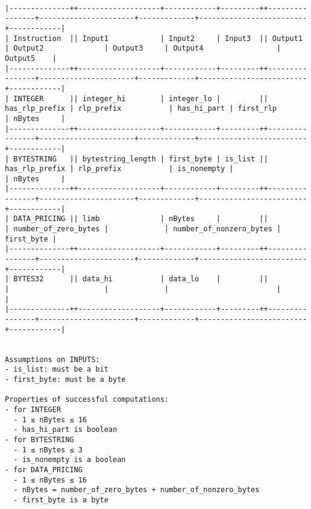 \documentclass[varwidth=\maxdimen,margin=0.5cm,multi={verbatim}]{standalone}
\begin{document}
\begin{verbatim}

|--------------++-------------------+------------+---------++----------------+----------------------+-------------+-------------------------+------------|
| Instruction  || Input1            | Input2     | Input3  || Output1        | Output2              | Output3     | Output4                 | Output5    |
|--------------++-------------------+------------+---------++----------------+----------------------+-------------+-------------------------+------------|
| INTEGER      || integer_hi        | integer_lo |         || has_rlp_prefix | rlp_prefix           | has_hi_part | first_rlp               | nBytes     |
|--------------++-------------------+------------+---------++----------------+----------------------+-------------+-------------------------+------------|
| BYTESTRING   || bytestring_length | first_byte | is_list || has_rlp_prefix | rlp_prefix           | is_nonempty |                         | nBytes     |
|--------------++-------------------+------------+---------++----------------+----------------------+-------------+-------------------------+------------|
| DATA_PRICING || limb              | nBytes     |         ||                | number_of_zero_bytes |             | number_of_nonzero_bytes | first_byte |
|--------------++-------------------+------------+---------++----------------+----------------------+-------------+-------------------------+------------|
| BYTES32      || data_hi           | data_lo    |         ||                |                      |             |                         |            |
|--------------++-------------------+------------+---------++----------------+----------------------+-------------+-------------------------+------------|


Assumptions on INPUTS:
- is_list: must be a bit
- first_byte: must be a byte

Properties of successful computations:
- for INTEGER
  - 1 ≤ nBytes ≤ 16
  - has_hi_part is boolean
- for BYTESTRING
  - 1 ≤ nBytes ≤ 3
  - is_nonempty is a boolean
- for DATA_PRICING
  - 1 ≤ nBytes ≤ 16
  - nBytes = number_of_zero_bytes + number_of_nonzero_bytes
  - first_byte is a byte
\end{verbatim}
\end{document}
